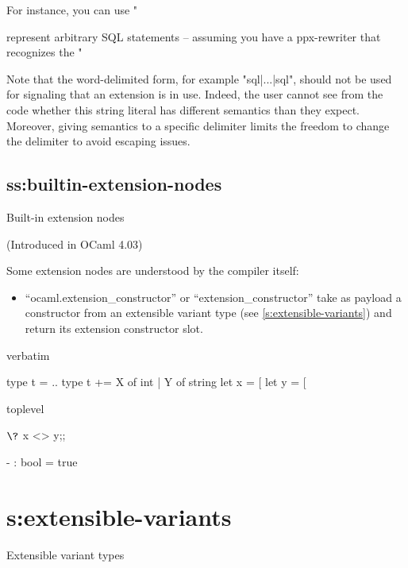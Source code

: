 For instance, you can use "{%
represent arbitrary SQL statements -- assuming you have a ppx-rewriter
that recognizes the "%

Note that the word-delimited form, for example "{sql|...|sql}", should
not be used for signaling that an extension is in use.
Indeed, the user cannot see from the code whether this string literal has
different semantics than they expect. Moreover, giving semantics to a
specific delimiter limits the freedom to change the delimiter to avoid
escaping issues.

\subsection{ss:builtin-extension-nodes}{Built-in extension nodes}

(Introduced in OCaml 4.03)

Some extension nodes are understood by the compiler itself:
\begin{itemize}
  \item
    ``ocaml.extension_constructor'' or ``extension_constructor''
    take as payload a constructor from an extensible variant type
    (see \ref{s:extensible-variants}) and return its extension
    constructor slot.
\end{itemize}

\begin{camlexample}{verbatim}
\begin{caml}
\begin{camlinput}
type t = ..
type t += X of int | Y of string
let x = [%
let y = [%
\end{camlinput}
\end{caml}
\end{camlexample}
\begin{camlexample}{toplevel}
\begin{caml}
\begin{camlinput}
$\?$  x <> y;;
\end{camlinput}
\begin{camloutput}
- : bool = true
\end{camloutput}
\end{caml}
\end{camlexample}

\section{s:extensible-variants}{Extensible variant types}

}
